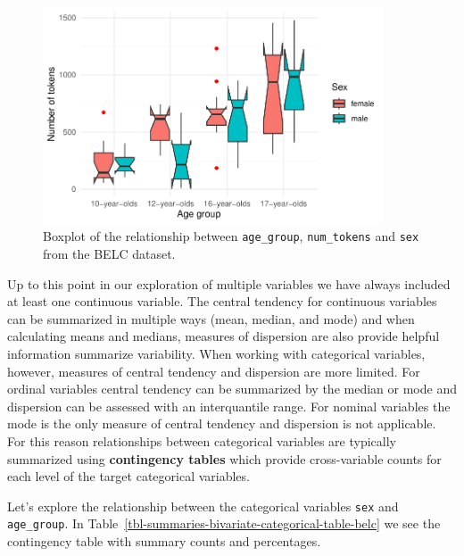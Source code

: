 \documentclass[
  letterpaper,
]{latex/krantz}
\begin{document}
\begin{figure}[h]

{\centering \includegraphics[width=0.9\textwidth,height=\textheight]{./approaching-analysis_files/figure-pdf/fig-summaries-multivariate-boxplots-belc-1.pdf}

}

\caption{\label{fig-summaries-multivariate-boxplots-belc}Boxplot of the
relationship between \texttt{age\_group}, \texttt{num\_tokens} and
\texttt{sex} from the BELC dataset.}

\end{figure}

Up to this point in our exploration of multiple variables we have always
included at least one continuous variable. The central tendency for
continuous variables can be summarized in multiple ways (mean, median,
and mode) and when calculating means and medians, measures of dispersion
are also provide helpful information summarize variability. When working
with categorical variables, however, measures of central tendency and
dispersion are more limited. For ordinal variables central tendency can
be summarized by the median or mode and dispersion can be assessed with
an interquantile range. For nominal variables the mode is the only
measure of central tendency and dispersion is not applicable. For this
reason relationships between categorical variables are typically
summarized using \textbf{contingency tables} which provide
cross-variable counts for each level of the target categorical
variables.

Let's explore the relationship between the categorical variables
\texttt{sex} and \texttt{age\_group}. In
Table~\ref{tbl-summaries-bivariate-categorical-table-belc} we see the
contingency table with summary counts and percentages.
\end{document}
